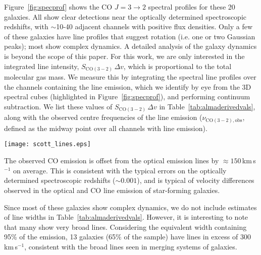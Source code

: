 \documentclass[a4paper,fleqn,usenatbib]{mnras}
\newcommand{\tbd}{{\bf TBD}}
\begin{document}
Figure~\ref{fig:specprof} shows the CO $J=3\rightarrow2$ spectral profiles for these 20 galaxies. All show clear detections near the optically determined spectroscopic redshifts, with $\sim$10-40 adjacent channels with positive flux densities. Only a few of these galaxies have line profiles that suggest rotation (i.e. one or two Gaussian peaks); most show complex dynamics. A detailed analysis of the galaxy dynamics is beyond the scope of this paper. For this work, we are only interested in the integrated line intensity, $S_{\mathrm{CO(3-2)}}\,\Delta v$, which is proportional to the total molecular gas mass. We measure this by integrating the spectral line profiles over the channels containing the line emission, which we identify by eye from the 3D spectral cubes (highlighted in Figure~\ref{fig:specprof}), and performing continuum subtraction. We list these values of $S_{\mathrm{CO(3-2)}}\,\Delta v$ in Table~\ref{tab:almaderivedvals}, along with the observed centre frequencies of the line emission ($\nu_{\mathrm{CO(3-2),obs}}$, defined as the midway point over all channels with line emission).

\begin{figure*}
\begin{center}
\texttt{[image: scott\_lines.eps]}
\caption{Spectral profiles of the CO $J=3\rightarrow2$ emission for the 20 LIRGs measured by ALMA. The source identifications and redshifts are labeled on each panel. For each galaxy, the blue shaded region indicates the channels with line emission, over which we integrate to compute the integrated line flux densities listed in Table~\ref{tab:almaderivedvals}. The dashed vertical lines show the centre of the CO line emission (blue) and the expected locations of the redshifted CO line from the optically determined redshifts (red).}
\label{fig:specprof}
\end{center}
\end{figure*}

The observed CO emission is offset from the optical emission lines by $\approx150$\,km\,s$^{-1}$ on average. This is consistent with the typical errors on the optically determined spectroscopic redshifts ($\sim0.001$), and is typical of velocity differences observed in the optical and CO line emission of star-forming galaxies.\cite[e.g.][]{2002ApJ...580L..21W,2015ApJ...803....6M} %

Since most of these galaxies show complex dynamics, we do not include estimates of line widths in Table~\ref{tab:almaderivedvals}. However, it is interesting to note that many show very broad lines. Considering the equivalent width containing 95\% of the emission, 13 galaxies (65\% of the sample) have lines in excess of 300\,km\,s$^{-1}$, consistent with the broad lines seen in merging systems of galaxies.
\end{document}
